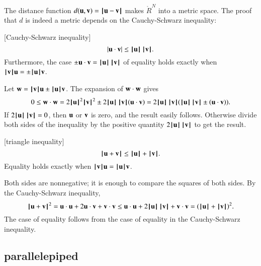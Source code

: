 The distance function $d(\u,\v) = \norm{ \u }{ \v}$ makes
$\ring{R}^N$ into a metric space.  
%
%
%
The proof that $d$ is indeed a metric depends on the Cauchy-Schwarz inequality:


\begin{lemma}[Cauchy-Schwarz inequality]
    $$|\u \cdot \v| \le \normo{\u}\,\normo{\v}.$$
Furthermore, the case
$\pm \u\cdot \v = \normo{\u}\,\normo{\v}$  of equality holds exactly when $\normo{\v} \u = \pm\normo{\u} \v$.
\end{lemma}
%

\begin{proved}
   Let $\w = \normo{\v} \u \pm \normo{\u} \v$.  The expansion of $\w\cdot \w$ gives
    $$0\le \w\cdot \w = 2\normo{\u}^2\normo{\v}^2 \pm 2\normo{\u}\, \normo{\v} (\u\cdot \v) =
    2\normo{\u}\,
    \normo{\v} (\normo{\u}\, \normo{\v} \pm (\u \cdot \v)).$$
    If $2\normo{\u} \,\normo{\v} = 0$, then $\u$ or $\v$ is zero, and the result
    easily follows.  Otherwise divide both sides of the inequality
    by the positive quantity $2 \normo{\u} \,\normo{\v}$ to get the result.
\swallowed\end{proved}

\begin{lemma}[triangle inequality]
  $$
  \normo{\u + \v} \le \normo{\u} + \normo{\v }.
  $$
Equality holds exactly when $\normo{\v}\u = \normo{\u}\v$.
\end{lemma}
%

\begin{proved}
Both sides are nonnegative; it is enough to compare the squares of
both sides.  By the Cauchy-Schwarz inequality,
    $$\normo{\u + \v}^2 = \u\cdot \u + 2 \u\cdot \v + \v\cdot \v \le
      \u\cdot \u + 2 \normo{ \u}\,\normo{\v} + \v\cdot \v = (\normo{\u}+\normo{\v})^2.
    $$
The case of equality follows from the case of equality in the
Cauchy-Schwarz inequality.
\swallowed\end{proved}





\subsection{parallelepiped}\label{sec:piped}
%



